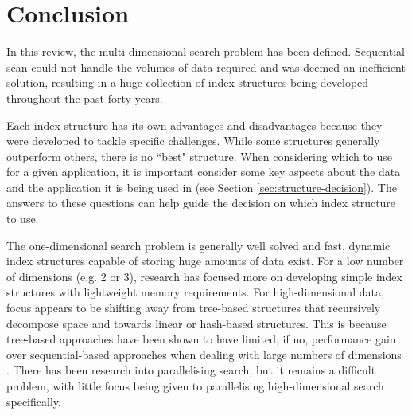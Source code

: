 \section{Conclusion}

In this review, the multi-dimensional search problem has been defined. Sequential scan could not handle the volumes of data required and was deemed an inefficient solution, resulting in a huge collection of index structures being developed throughout the past forty years.

Each index structure has its own advantages and disadvantages because they were developed to tackle specific challenges. While some structures generally outperform others, there is no ``best" structure. When considering which to use for a given application, it is important consider some key aspects about the data and the application it is being used in (see Section \ref{sec:structure-decision}). The answers to these questions can help guide the decision on which index structure to use.

The one-dimensional search problem is generally well solved and fast, dynamic index structures capable of storing huge amounts of data exist. For a low number of dimensions (e.g. 2 or 3), research has focused more on developing simple index structures with lightweight memory requirements. For high-dimensional data, focus appears to be shifting away from tree-based structures that recursively decompose space and towards linear or hash-based structures. This is because tree-based approaches have been shown to have limited, if no, performance gain over sequential-based approaches when dealing with large numbers of dimensions \cite{md-structures-samet}. There has been research into parallelising search, but it remains a difficult problem, with little focus being given to parallelising high-dimensional search specifically.